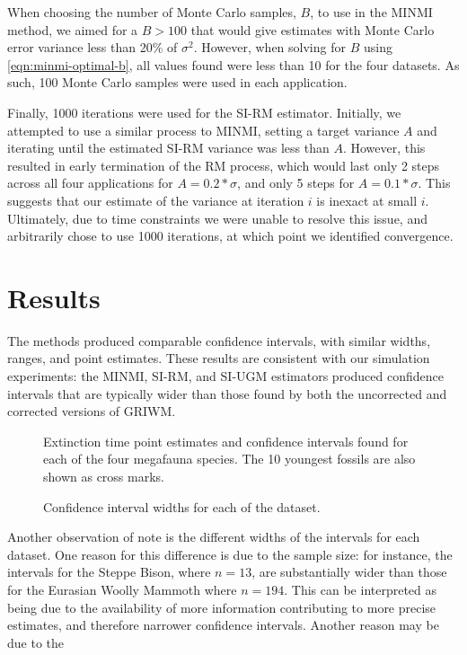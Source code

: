 When choosing the number of Monte Carlo samples, $B$, to use in the MINMI method, we aimed for a $B > 100$ that would give estimates with Monte Carlo error variance less than 20\% of $\sigma^2$. However, when solving for $B$ using \autoref{eqn:minmi-optimal-b}, all values found were less than 10 for the four datasets. As such, 100 Monte Carlo samples were used in each application.

Finally, 1000 iterations were used for the SI-RM estimator. Initially, we attempted to use a similar process to MINMI, setting a target variance $A$ and iterating until the estimated SI-RM variance was less than $A$. However, this resulted in early termination of the RM process, which would last only 2 steps across all four applications for $A  = 0.2*\sigma$, and only 5 steps for $A = 0.1*\sigma$. This suggests that our estimate of the variance at iteration $i$ is inexact at small $i$. Ultimately, due to time constraints we were unable to resolve this issue, and arbitrarily chose to use 1000 iterations, at which point we identified convergence.
\clearpage

\section{Results}

The methods produced comparable confidence intervals, with similar widths, ranges, and point estimates. These results are consistent with our simulation experiments: the MINMI, SI-RM, and SI-UGM estimators produced confidence intervals that are typically wider than those found by both the uncorrected and corrected versions of GRIWM.
\begin{figure}[ht]
    \centering
    
    \caption{Extinction time point estimates and confidence intervals found for each of the four megafauna species. The 10 youngest fossils are also shown as cross marks.}
    \label{fig:applications-confidence-intervals}
\end{figure}
\begin{figure}[ht]
    \centering
    
    \caption{Confidence interval widths for each of the dataset.}
    \label{fig:application-widths-barplot}
\end{figure}

Another observation of note is the different widths of the intervals for each dataset. One reason for this difference is due to the sample size: for instance, the intervals for the Steppe Bison, where $n = 13$, are substantially wider than those for the Eurasian Woolly Mammoth where $n = 194$. This can be interpreted as being due to the availability of more information contributing to more precise estimates, and therefore narrower confidence intervals. Another reason may be due to the 

